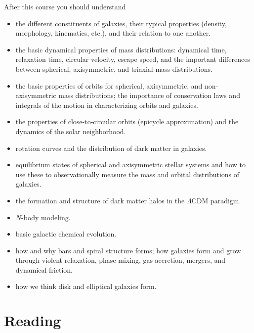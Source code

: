 \documentclass{article}
\begin{document}
After this course you should understand

\begin{itemize}

  \item the different constituents of galaxies, their typical
    properties (density, morphology, kinematics, etc.), and their
    relation to one another.

  \item the basic dynamical properties of mass distributions:
    dynamical time, relaxation time, circular velocity, escape speed,
    and the important differences between spherical, axisymmetric, and
    triaxial mass distributions.

  \item the basic properties of orbits for spherical, axisymmetric,
    and non-axisymmetric mass distributions; the importance of
    conservation laws and integrals of the motion in characterizing
    orbits and galaxies.

  \item the properties of close-to-circular orbits (epicycle
    approximation) and the dynamics of the solar neighborhood.

  \item rotation curves and the distribution of dark matter in
    galaxies.

  \item equilibrium states of spherical and axisymmetric stellar
    systems and how to use these to observationally measure the mass and
    orbital distributions of galaxies.

  \item the formation and structure of dark matter halos in the
    $\Lambda$CDM paradigm.

  \item $N$-body modeling.

  \item basic galactic chemical evolution.

  \item how and why bars and spiral structure forms; how galaxies form
    and grow through violent relaxation, phase-mixing, gas accretion,
    mergers, and dynamical friction.

  \item how we think disk and elliptical galaxies form.

\end{itemize}

\section*{Reading}
\end{document}
